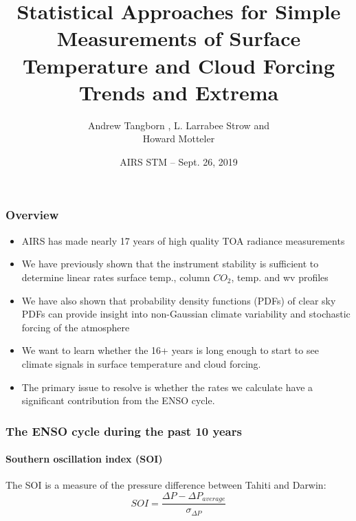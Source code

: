 \documentclass[10pt,t]{beamer}
\title{Statistical Approaches for Simple Measurements of  Surface Temperature and
Cloud Forcing Trends and Extrema}
\author{Andrew Tangborn , L. Larrabee Strow and \\ Howard Motteler }
\institute{Joint Center for Earth Systems Technology and \\ UMBC Department of Physics}
\date{AIRS STM  -- Sept. 26, 2019}
\begin{document}
\maketitle
{}
\frame{\maketitle}
\begin{frame}
  \frametitle{Overview}
    \begin{itemize}
    \item AIRS has made nearly 17 years of high quality TOA radiance measurements 
    \item We have previously shown that the instrument stability is sufficient to determine linear rates surface temp., column $CO_2$, temp. and wv profiles  
    \item We have also shown that probability density functions (PDFs) of clear sky PDFs can provide insight into non-Gaussian climate variability and stochastic forcing of the atmosphere 
    \item We want to learn whether the 16+ years is long enough to start to see climate signals in surface temperature and cloud forcing.   
    \item The primary issue to resolve is whether the rates we calculate have a significant contribution from the ENSO cycle.  
    \end{itemize}
\end{frame}
\begin{frame}
  \frametitle{The ENSO cycle during the past 10 years}
  \framesubtitle{ Southern oscillation index (SOI)} 

The SOI is a measure of the pressure difference between Tahiti and Darwin:
$$ 
SOI =  \frac{\Delta P - \Delta P_{average}}{\sigma_{\Delta P}}
$$


\end{frame}
\end{document}
